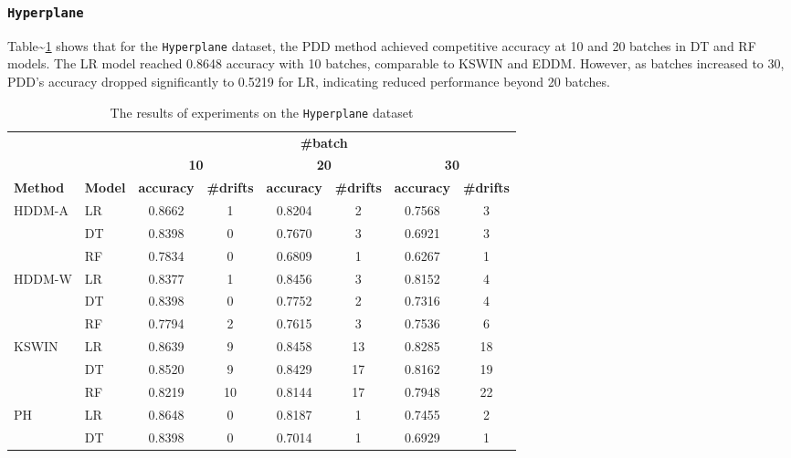 \hypertarget{section-1}{%
\subsubsection{\texorpdfstring{\texttt{Hyperplane}}{}}\label{section-1}}

Table\textasciitilde{}\ref{tab:exp_Hyperplane} shows that for the \texttt{Hyperplane} dataset, the PDD method achieved competitive accuracy at 10 and 20 batches in DT and RF models. The LR model reached 0.8648 accuracy with 10 batches, comparable to KSWIN and EDDM. However, as batches increased to 30, PDD's accuracy dropped significantly to 0.5219 for LR, indicating reduced performance beyond 20 batches.

\begin{table}[H]
    \centering
    \small
    \caption{The results of experiments on the \texttt{Hyperplane} dataset}
    \label{tab:exp_Hyperplane}
    \begin{tabular}{llcccccc}\toprule
        && \multicolumn{6}{c}{\textbf{\#batch}}\\\cmidrule(lr){3-8}
        && \multicolumn{2}{c}{\textbf{10}}    & \multicolumn{2}{c}{\textbf{20}} & \multicolumn{2}{c}{\textbf{30}} \\\cmidrule(lr){3-8}
        \textbf{Method} & \textbf{Model} & \textbf{accuracy} & \textbf{\#drifts} & \textbf{accuracy} & \textbf{\#drifts} & \textbf{accuracy} & \textbf{\#drifts} \\\midrule
        HDDM-A & LR & 0.8662 & 1 & 0.8204 & 2 & 0.7568 & 3 \\
        & DT & 0.8398 & 0 & 0.7670 & 3 & 0.6921 & 3 \\
        & RF & 0.7834 & 0 & 0.6809 & 1 & 0.6267 & 1 \\
        \midrule
        HDDM-W & LR & 0.8377 & 1 & 0.8456 & 3 & 0.8152 & 4 \\
        & DT & 0.8398 & 0 & 0.7752 & 2 & 0.7316 & 4 \\
        & RF & 0.7794 & 2 & 0.7615 & 3 & 0.7536 & 6 \\
        \midrule
        KSWIN & LR & 0.8639 & 9 & 0.8458 & 13 & 0.8285 & 18 \\
        & DT & 0.8520 & 9 & 0.8429 & 17 & 0.8162 & 19 \\
        & RF & 0.8219 & 10 & 0.8144 & 17 & 0.7948 & 22 \\
        \midrule
        PH & LR & 0.8648 & 0 & 0.8187 & 1 & 0.7455 & 2 \\
        & DT & 0.8398 & 0 & 0.7014 & 1 & 0.6929 & 1 \\

\end{tabular}
\end{table}

